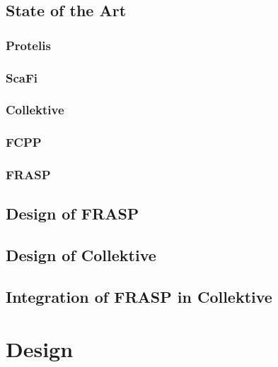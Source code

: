 \documentclass[12pt,a4paper,openright,twoside]{book}
\begin{document}
\section{State of the Art}

\subsection{Protelis}

\subsection{ScaFi}

\subsection{Collektive}

\subsection{FCPP}

\subsection{FRASP}

\section{Design of FRASP}


\section{Design of Collektive}


\section{Integration of FRASP in Collektive}

\chapter{Design}
\label{chap:design}
\end{document}

